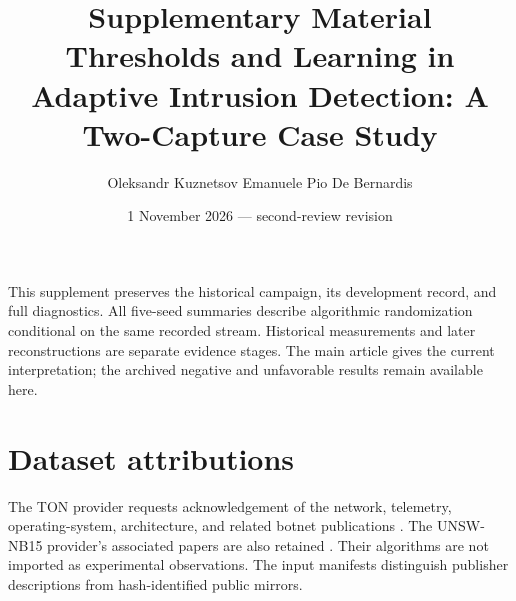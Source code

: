 
\renewcommand{\thesection}{S\arabic{section}}
\renewcommand{\thetable}{S\arabic{table}}
\renewcommand{\thefigure}{S\arabic{figure}}
\title{\vspace{-12mm}\textbf{Supplementary Material}\\[5pt]\large Thresholds and Learning in Adaptive Intrusion Detection: A Two-Capture Case Study}
\author{Oleksandr Kuznetsov \quad Emanuele Pio De Bernardis}
\date{1 November 2026 --- second-review revision}
\maketitle\thispagestyle{plain}
This supplement preserves the historical campaign, its development record, and full diagnostics. All five-seed summaries describe algorithmic randomization conditional on the same recorded stream. Historical measurements and later reconstructions are separate evidence stages. The main article gives the current interpretation; the archived negative and unfavorable results remain available here.

\FloatBarrier

\FloatBarrier

\FloatBarrier

\FloatBarrier

\FloatBarrier
\section{Dataset attributions}
The TON provider requests acknowledgement of the network, telemetry, operating-system, architecture, and related botnet publications \citep{moustafa2021,booij2022,alsaedi2020,moustafa2020windows,moustafa2020linux,moustafa2019dataset,moustafa2019fog,ashraf2021}. The UNSW-NB15 provider's associated papers are also retained \citep{moustafa2015unsw,moustafa2016unsw,moustafa2019geometry,moustafa2017dirichlet,sarhan2021}. Their algorithms are not imported as experimental observations. The input manifests distinguish publisher descriptions from hash-identified public mirrors.
\begingroup\small\raggedright\endgroup

